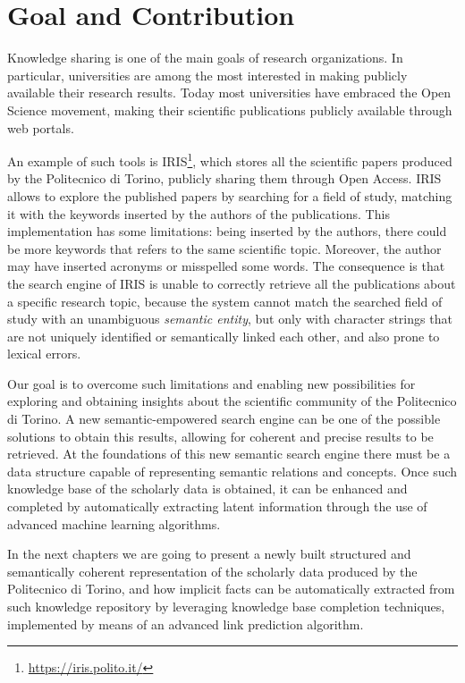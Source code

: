 \documentclass[%
    corpo=13.5pt,
    twoside,
    oldstyle,
    tipotesi=magistrale,
    greek,
    evenboxes
]{toptesi}
\begin{document}
\section{Goal and Contribution}

Knowledge sharing is one of the main goals of research organizations. In
particular, universities are among the most interested in making publicly
available their research results. Today most universities have embraced the Open
Science movement, making their scientific publications publicly available
through web portals.

An example of such tools is IRIS\footnote{\url{https://iris.polito.it/}}, which
stores all the scientific papers produced by the Politecnico di Torino,
publicly sharing them through Open Access.
IRIS allows to explore the published papers by searching for a field of study,
matching it with the keywords inserted by the authors of the publications.
This implementation has some limitations: being inserted by the authors, there
could be more keywords that refers to the same scientific topic.
Moreover, the author may have inserted acronyms or misspelled some words.
The consequence is that the search engine of IRIS is unable to correctly
retrieve all the publications about a specific research topic, because the
system cannot match the searched field of study with an unambiguous
\emph{semantic entity}, but only with character strings that are not
uniquely identified or semantically linked each other, and also prone to
lexical errors.

Our goal is to overcome such limitations and enabling new possibilities for
exploring and obtaining insights about the scientific community of the
Politecnico di Torino. A new semantic-empowered search engine can be
one of the possible solutions to obtain this results, allowing for coherent and
precise results to be retrieved.
At the foundations of this new semantic search engine there must be a data
structure capable of representing semantic relations and concepts. Once such
knowledge base of the scholarly data is obtained, it can be enhanced and
completed by automatically extracting latent information through the use of
advanced machine learning algorithms.

In the next chapters we are going to present a newly built structured and
semantically coherent representation of the scholarly data produced by the
Politecnico di Torino, and how implicit facts can be automatically
extracted from such knowledge repository by leveraging knowledge base
completion techniques, implemented by means of an advanced link prediction
algorithm.
\end{document}
